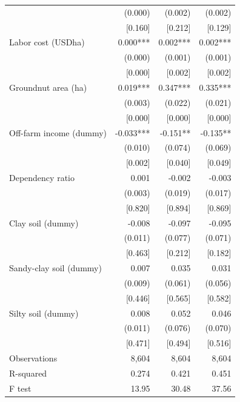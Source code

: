 \documentclass[
]{article}
\begin{document}
\begin{ThreePartTable}
\begin{longtable}[t]{lrrr}
 & (0.000) & (0.002) & (0.002)\\
 & {}[0.160] & {}[0.212] & {}[0.129]\\
Labor cost (USD\/ha) & 0.000*** & 0.002*** & 0.002***\\
 & (0.000) & (0.001) & (0.001)\\
 & {}[0.000] & {}[0.002] & {}[0.002]\\
Groundnut area (ha) & 0.019*** & 0.347*** & 0.335***\\
 & (0.003) & (0.022) & (0.021)\\
 & {}[0.000] & {}[0.000] & {}[0.000]\\
Off-farm income (dummy) & -0.033*** & -0.151** & -0.135**\\
 & (0.010) & (0.074) & (0.069)\\
 & {}[0.002] & {}[0.040] & {}[0.049]\\
Dependency ratio & 0.001 & -0.002 & -0.003\\
 & (0.003) & (0.019) & (0.017)\\
 & {}[0.820] & {}[0.894] & {}[0.869]\\
Clay soil (dummy) & -0.008 & -0.097 & -0.095\\
 & (0.011) & (0.077) & (0.071)\\
 & {}[0.463] & {}[0.212] & {}[0.182]\\
Sandy-clay soil (dummy) & 0.007 & 0.035 & 0.031\\
 & (0.009) & (0.061) & (0.056)\\
 & {}[0.446] & {}[0.565] & {}[0.582]\\
Silty soil (dummy) & 0.008 & 0.052 & 0.046\\
 & (0.011) & (0.076) & (0.070)\\
 & {}[0.471] & {}[0.494] & {}[0.516]\\
Observations & 8,604 & 8,604 & 8,604\\
R-squared & 0.274 & 0.421 & 0.451\\
F test & 13.95 & 30.48 & 37.56\\*
\end{longtable}
\end{ThreePartTable}
\endgroup{}

\newpage

\begingroup\fontsize{7}{9}\selectfont
\end{document}
